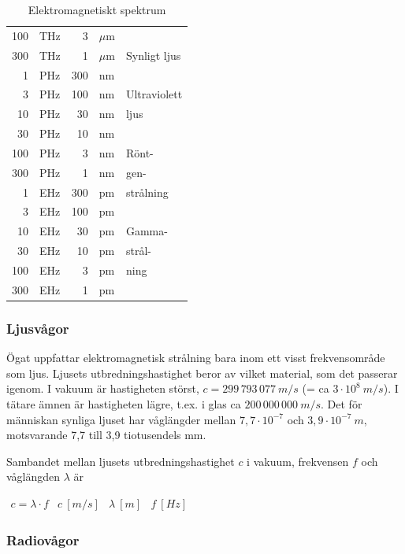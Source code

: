 \begin{table}
\begin{center}
\begin{tabular}{|rl|rl|l|}
100 & THz &   3 & \(\mu\)m & \\ \cline{5-5}
300 & THz &   1 & \(\mu\)m & Synligt ljus \\ \cline{5-5}
  1 & PHz & 300 & nm & \\
  3 & PHz & 100 & nm & Ultraviolett \\
 10 & PHz &  30 & nm & ljus \\ \cline{5-5}
 30 & PHz &  10 & nm & \\
100 & PHz &   3 & nm & Rönt-\\
300 & PHz &   1 & nm & gen-\\
  1 & EHz & 300 & pm & strålning\\ \cline{5-5}
  3 & EHz & 100 & pm & \\
 10 & EHz &  30 & pm & Gamma-\\
 30 & EHz &  10 & pm & strål-\\
100 & EHz &   3 & pm & ning\\
300 & EHz &   1 & pm & \\
\hline
\end{tabular}
\end{center}
\caption{Elektromagnetiskt spektrum}
\label{tab:elektromagnetiskt_spektrum}
\end{table}

\subsubsection{Ljusvågor}

Ögat uppfattar elektromagnetisk strålning bara inom ett visst frekvensområde
som ljus. Ljusets utbredningshastighet beror av vilket material, som det
passerar igenom. I vakuum är hastigheten störst, \(c = 299\, 793\, 077\ m/s\)
(= ca \(3 \cdot 10^8\ m/s\)). I tätare ämnen är hastigheten lägre, t.ex. i
glas ca \(200\, 000\, 000\ m/s\). Det för människan synliga ljuset har
våglängder mellan \(7,7 \cdot 10^{-7}\) och \(3,9 \cdot 10^{-7}\ m\), motsvarande
7,7 till 3,9 tiotusendels mm.

Sambandet mellan ljusets utbredningshastighet \(c\) i vakuum, frekvensen \(f\)
och våglängden \(\lambda\) är

\(
\begin{array}{llll}
c = \lambda \cdot f & c \ [m/s] & \lambda \ [m] & f \ [Hz]
\end{array}
\)

\subsubsection{Radiovågor}

